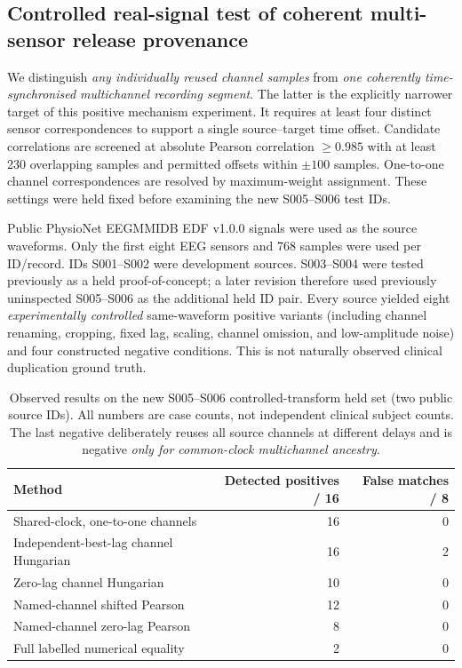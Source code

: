 \subsection{Controlled real-signal test of coherent multi-sensor release provenance}
\label{sec:p2-source-clock-positive}
We distinguish \emph{any individually reused channel samples} from
\emph{one coherently time-synchronised multichannel recording segment}.
The latter is the explicitly narrower target of this positive mechanism
experiment. It requires at least four distinct sensor correspondences
to support a single source--target time offset. Candidate correlations
are screened at absolute Pearson correlation $\geq0.985$ with at least
230 overlapping samples and permitted offsets within $\pm100$ samples.
One-to-one channel correspondences are resolved by maximum-weight
assignment. These settings were held fixed before examining the new
S005--S006 test IDs.

Public PhysioNet EEGMMIDB EDF v1.0.0 signals were used as the source
waveforms. Only the first eight EEG sensors and 768 samples were used
per ID/record. IDs S001--S002 were development sources. S003--S004
were tested previously as a held proof-of-concept; a later revision
therefore used previously uninspected S005--S006 as the additional held
ID pair. Every source yielded eight \emph{experimentally controlled}
same-waveform positive variants (including channel renaming, cropping,
fixed lag, scaling, channel omission, and low-amplitude noise) and
four constructed negative conditions. This is not naturally observed
clinical duplication ground truth.

\begin{table}[tb]
\centering
\small
\caption{Observed results on the new S005--S006 controlled-transform
held set (two public source IDs). All numbers are case counts, not
independent clinical subject counts. The last negative deliberately
reuses all source channels at different delays and is negative
\emph{only for common-clock multichannel ancestry}.}
\label{tab:p2-source-clock-physionet-new-held}
\begin{tabular}{lrr}
\toprule
Method & Detected positives / 16 & False matches / 8\\
\midrule
Shared-clock, one-to-one channels & 16 & 0\\
Independent-best-lag channel Hungarian & 16 & 2\\
Zero-lag channel Hungarian & 10 & 0\\
Named-channel shifted Pearson & 12 & 0\\
Named-channel zero-lag Pearson & 8 & 0\\
Full labelled numerical equality & 2 & 0\\
\bottomrule
\end{tabular}
\end{table}

